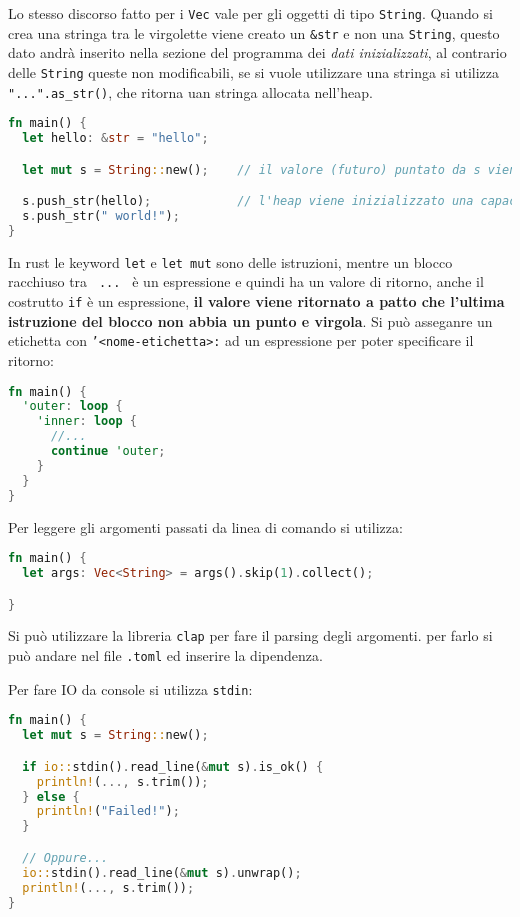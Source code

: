 \documentclass[12pt]{article}
\begin{document}
Lo stesso discorso fatto per i \texttt{Vec} vale per gli oggetti di tipo \texttt{String}. Quando si crea una stringa tra le virgolette viene creato un \texttt{\&str} e non una \texttt{String}, questo dato andr\`a inserito nella sezione del programma dei \emph{dati inizializzati}, al contrario delle \texttt{String} queste non modificabili, se si vuole utilizzare una stringa si utilizza \texttt{"...".as\_str()}, che ritorna uan stringa allocata nell'heap.
\begin{lstlisting}[language=rust]
fn main() {
  let hello: &str = "hello";

  let mut s = String::new();    // il valore (futuro) puntato da s viene allocato nell'heap

  s.push_str(hello);            // l'heap viene inizializzato una capacita' ed un size uguale al size della stringa puntata da "hello"
  s.push_str(" world!");
}
\end{lstlisting}
In rust le keyword \texttt{let} e \texttt{let mut} sono delle istruzioni, mentre un blocco racchiuso tra \texttt{{ ... }} \`e un espressione e quindi ha un valore di ritorno, anche il costrutto \texttt{if} \`e un espressione, \textbf{il valore viene ritornato a patto che l'ultima istruzione del blocco non abbia un punto e virgola}. Si pu\`o asseganre un etichetta con \texttt{'<nome-etichetta>:} ad un espressione per poter specificare il ritorno:
\begin{lstlisting}[language=rust]
fn main() {
  'outer: loop {
    'inner: loop {
      //...
      continue 'outer;
    }
  }
}
\end{lstlisting}

Per leggere gli argomenti passati da linea di comando si utilizza:
\begin{lstlisting}[language=rust]
fn main() {
  let args: Vec<String> = args().skip(1).collect();

}
\end{lstlisting}
Si pu\`o utilizzare la libreria \texttt{clap} per fare il parsing degli argomenti. per farlo si pu\`o andare nel file \texttt{.toml} ed inserire la dipendenza.


Per fare IO da console si utilizza \texttt{stdin}:
\begin{lstlisting}[language=rust]
fn main() {
  let mut s = String::new();

  if io::stdin().read_line(&mut s).is_ok() {
    println!(..., s.trim());
  } else {
    println!("Failed!");
  }

  // Oppure...
  io::stdin().read_line(&mut s).unwrap();
  println!(..., s.trim());
}
\end{lstlisting}
\end{document}
